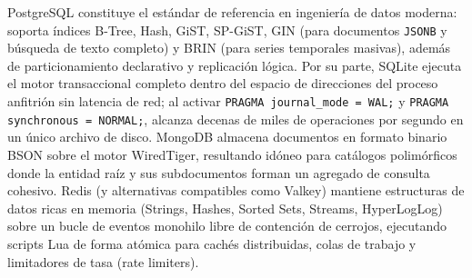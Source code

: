 \documentclass{book}
\begin{document}
PostgreSQL constituye el estándar de referencia en ingeniería de datos moderna: soporta índices B-Tree, Hash, GiST, SP-GiST, GIN (para documentos \texttt{JSONB} y búsqueda de texto completo) y BRIN (para series temporales masivas), además de particionamiento declarativo y replicación lógica. Por su parte, SQLite ejecuta el motor transaccional completo dentro del espacio de direcciones del proceso anfitrión sin latencia de red; al activar \texttt{PRAGMA journal\_mode = WAL;} y \texttt{PRAGMA synchronous = NORMAL;}, alcanza decenas de miles de operaciones por segundo en un único archivo de disco.
MongoDB almacena documentos en formato binario BSON sobre el motor WiredTiger, resultando idóneo para catálogos polimórficos donde la entidad raíz y sus subdocumentos forman un agregado de consulta cohesivo. Redis (y alternativas compatibles como Valkey) mantiene estructuras de datos ricas en memoria (Strings, Hashes, Sorted Sets, Streams, HyperLogLog) sobre un bucle de eventos monohilo libre de contención de cerrojos, ejecutando scripts Lua de forma atómica para cachés distribuidas, colas de trabajo y limitadores de tasa (rate limiters).
\end{document}
